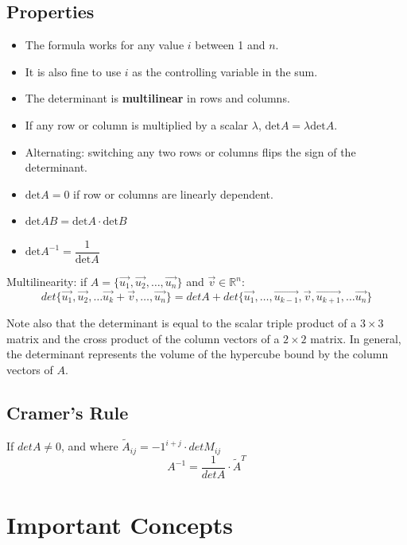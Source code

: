 \documentclass[11pt]{article}
\begin{document}
	\subsection{Properties}
		\begin{itemize}
			\item The formula works for any value $i$ between 1 and $n$.
			\item It is also fine to use $i$ as the controlling variable in the sum.
			\item The determinant is \textbf{multilinear} in rows and columns.
			\item If any row or column is multiplied by a scalar $\lambda$, $\text{det} A = \lambda\text{det} A$.
			\item Alternating: switching any two rows or columns flips the sign of the determinant.
			\item $\text{det} A = 0$ if row or columns are linearly dependent.
			\item $\text{det} AB = \text{det} A\cdot\text{det} B$
			\item $\text{det} A^{-1} = \dfrac{1}{\text{det} A}$
		\end{itemize}
		Multilinearity: if $A=\{\vec{u_1}, \vec{u_2},\ldots,\vec{u_n}\}$ and $\vec{v}\in\mathbb{R}^n$:
		\begin{equation}
			det\{\vec{u_1}, \vec{u_2},\ldots\vec{u_k}+\vec{v},\ldots,\vec{u_n}\} = det A + det\{\vec{u_1},\ldots,\vec{u_{k-1}},\vec{v},\vec{u_{k+1}},\ldots\vec{u_n}\}
		\end{equation}
		
		Note also that the determinant is equal to the scalar triple product of a $3\times 3$ matrix and the cross product of the column vectors of a $2\times 2$ matrix. In general, the determinant represents the volume of the hypercube bound by the column vectors of $A$.
		
	\subsection{Cramer's Rule}
		If $det A\neq 0$, and where $\tilde{A}_{ij} = -1^{i+j}\cdot detM_{ij}$
		\begin{equation}
			A^{-1} = \frac{1}{det A}\cdot \tilde{A}^T
		\end{equation}
		
\section*{Important Concepts}
\end{document}
